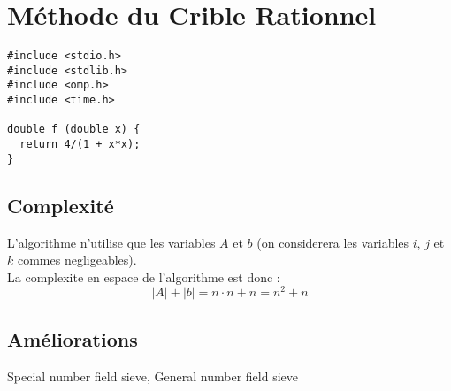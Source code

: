 \section{Méthode du Crible Rationnel}
    \begin{lstlisting}
#include <stdio.h>
#include <stdlib.h>
#include <omp.h>
#include <time.h>

double f (double x) {
  return 4/(1 + x*x);
}
    \end{lstlisting}
    

    \subsection{Complexité}
        
        L'algorithme n'utilise que les variables $A$ et $b$ (on considerera les variables $i$, $j$ et $k$ commes negligeables).\\
        La complexite en espace de l'algorithme est donc : $$\lvert A \rvert + \lvert b \rvert = n \cdot n + n = n ^2 +n$$
    
    \subsection{Améliorations}
    
    Special number field sieve, General number field sieve